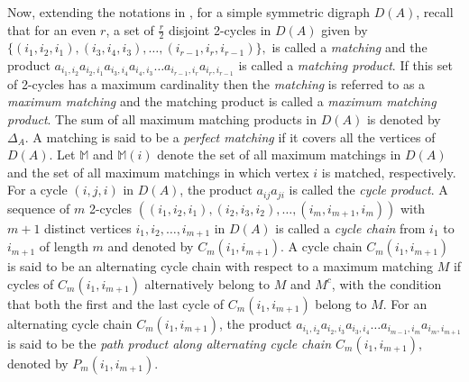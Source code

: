 \documentclass[notitlepage,12pt,reqno]{amsart}
\numberwithin{equation}{section}
\begin{document}
Now, extending the notations in \cite{nandi}, for a simple symmetric digraph $D(A)$, recall that for an even $r$, a set of $\frac{r}{2}$ disjoint 2-cycles in $D(A)$ given by $\{(i_1,i_2,i_1),(i_3,i_4,i_3),\ldots,(i_{r-1},i_r,i_{r-1})\},$  is called a {\it matching} and the product $a_{i_1,i_2}a_{i_2,i_1}a_{i_3,i_4}a_{i_4,i_3}\ldots a_{i_{r-1},i_r}a_{i_r,i_{r-1}}$ is called a {\it matching product}. If this set of 2-cycles has a maximum cardinality then the {\it matching} is referred to as a {\it maximum matching} and the matching product is called a {\it maximum matching product}. The sum of all maximum matching products in $D(A)$ is denoted by $\Delta_A$. A matching is said to be a {\it perfect matching} if it covers all the vertices of $D(A)$. Let $\mathbb{M}$ and $\mathbb{M}(i)$ denote the set of all maximum matchings in $D(A)$ and the set of all maximum matchings in which vertex $i$ is matched, respectively. For a cycle $(i,j,i)$ in $D(A)$, the product $a_{ij}a_{ji}$ is called the {\it cycle product}. A sequence of $m$ 2-cycles $((i_1,i_2,i_1),(i_2,i_3,i_2),\ldots,(i_m,i_{m+1},i_m))$ with $m+1$ distinct vertices $i_1,i_2,\ldots ,i_{m+1}$ in $D(A)$ is called a {\it cycle chain} from $i_1$ to $i_{m+1}$ of length $m$ and denoted by $C_m(i_1,i_{m+1})$. A cycle chain $C_m(i_1,i_{m+1})$ is said to be an alternating cycle chain with respect to a maximum matching $M$ if cycles of $C_m(i_1,i_{m+1})$ alternatively belong to $M$ and $M^c$, with the condition that both the first and the last cycle of $C_m(i_1,i_{m+1})$ belong to $M$. For an alternating cycle chain $C_m(i_1,i_{m+1})$, the product $a_{i_1,i_2}a_{i_2,i_3}a_{i_3,i_4} \ldots a_{i_{m-1},i_m}a_{i_m,i_{m+1}}$ is said to be the {\it path product along alternating cycle chain $C_m(i_1,i_{m+1})$}, denoted by $P_m(i_1,i_{m+1})$.
\end{document}
